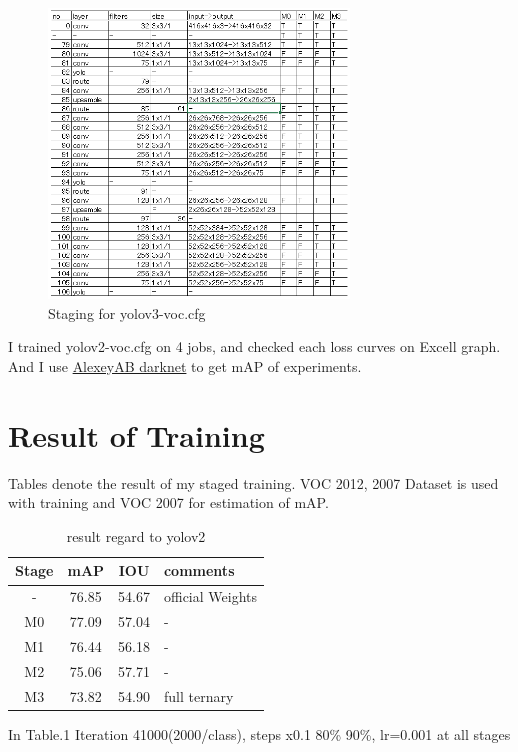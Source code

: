 \documentclass[10pt,a4paper,twocolumn]{article}
\begin{document}
\begin{figure}
\includegraphics[width=8cm]{yolov3-voc_Stages.png}
\caption{Staging for yolov3-voc.cfg}
\end{figure}

I trained yolov2-voc.cfg on 4 jobs, and checked each loss curves on Excell graph.
And I use \href{https://github.com/AlexeyAB/darknet}{AlexeyAB darknet} to get mAP of experiments.

\section{Result of Training}

Tables denote the result of my staged training.
VOC 2012, 2007 Dataset is used with training and VOC 2007 for estimation of mAP.

\begin{table}[htbp]
 \centering
 \begin{tabular}{c|c|c|l}
  Stage & mAP & IOU & comments \\ \hline\hline
  -        & 76.85 & 54.67 & official Weights \\ \hline
  M0       & 77.09 & 57.04 & -                \\ \hline
  M1       & 76.44 & 56.18 & -                \\ \hline
  M2       & 75.06 & 57.71 & -                \\ \hline
  M3       & 73.82 & 54.90 & full ternary     \\ \hline\hline
 \end{tabular}
 \caption{result regard to yolov2}
 \label{tb:yolov2}
\end{table}

In Table.1 Iteration 41000(2000/class), steps x0.1 80\% 90\%, lr=0.001 at all stages
\end{document}
